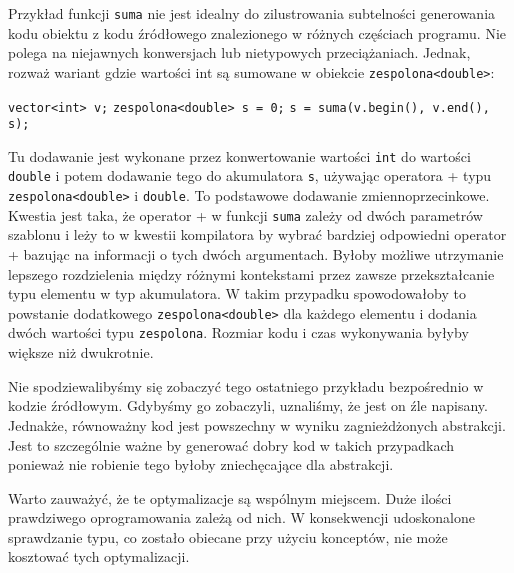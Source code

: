 \documentclass[11pt, a4paper]{article}
\begin{document}
Przykład funkcji \verb#suma# nie jest idealny do zilustrowania subtelności generowania kodu obiektu z kodu źródłowego znalezionego w różnych częściach programu. Nie polega na niejawnych konwersjach lub nietypowych przeciążaniach. Jednak, rozważ wariant gdzie wartości int są sumowane w obiekcie \verb#zespolona<double>#: \newline

\noindent \verb#vector<int> v;#  \newline
\verb#zespolona<double> s = 0;#  \newline
\verb#s = suma(v.begin(), v.end(), s);#  \newline

Tu dodawanie jest wykonane przez konwertowanie wartości \verb#int# do wartości \verb#double# i potem dodawanie tego do akumulatora \verb#s#, używając operatora + typu \verb#zespolona<double># i \verb#double#. To podstawowe dodawanie zmiennoprzecinkowe. Kwestia jest taka, że operator + w funkcji \verb#suma# zależy od dwóch parametrów szablonu i leży to w kwestii kompilatora by wybrać bardziej odpowiedni operator + bazując na informacji o tych dwóch argumentach. Byłoby możliwe utrzymanie lepszego rozdzielenia między różnymi kontekstami przez zawsze przekształcanie typu elementu w typ akumulatora. W takim przypadku spowodowałoby to powstanie dodatkowego \verb#zespolona<double># dla każdego elementu i dodania dwóch wartości typu \verb#zespolona#. Rozmiar kodu i czas wykonywania byłyby większe niż dwukrotnie.

Nie spodziewalibyśmy się zobaczyć tego ostatniego przykładu bezpośrednio w kodzie źródłowym. Gdybyśmy go zobaczyli, uznaliśmy, że jest on źle napisany. Jednakże, równoważny kod jest powszechny w wyniku zagnieżdżonych abstrakcji. Jest to szczególnie ważne by generować dobry kod w takich przypadkach ponieważ nie robienie tego byłoby zniechęcające dla abstrakcji. 

Warto zauważyć, że te optymalizacje są wspólnym miejscem. Duże ilości prawdziwego oprogramowania zależą od nich. W konsekwencji udoskonalone sprawdzanie typu, co zostało obiecane przy użyciu konceptów, nie może kosztować tych optymalizacji.
\end{document}
